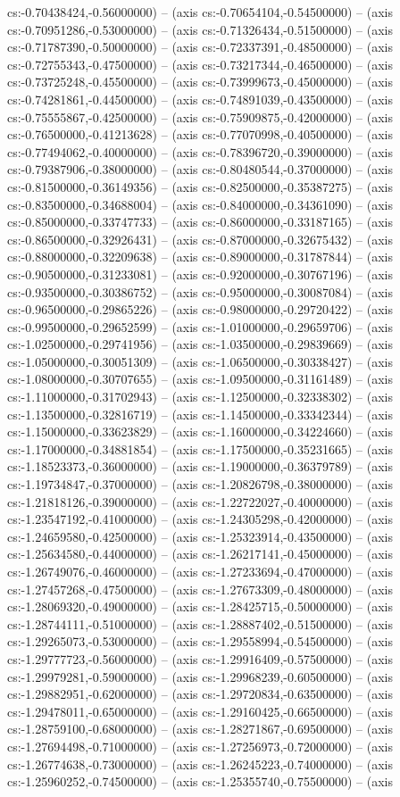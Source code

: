cs:-0.70438424,-0.56000000) -- (axis cs:-0.70654104,-0.54500000) -- (axis cs:-0.70951286,-0.53000000) -- (axis cs:-0.71326434,-0.51500000) -- (axis cs:-0.71787390,-0.50000000) -- (axis cs:-0.72337391,-0.48500000) -- (axis cs:-0.72755343,-0.47500000) -- (axis cs:-0.73217344,-0.46500000) -- (axis cs:-0.73725248,-0.45500000) -- (axis cs:-0.73999673,-0.45000000) -- (axis cs:-0.74281861,-0.44500000) -- (axis cs:-0.74891039,-0.43500000) -- (axis cs:-0.75555867,-0.42500000) -- (axis cs:-0.75909875,-0.42000000) -- (axis cs:-0.76500000,-0.41213628) -- (axis cs:-0.77070998,-0.40500000) -- (axis cs:-0.77494062,-0.40000000) -- (axis cs:-0.78396720,-0.39000000) -- (axis cs:-0.79387906,-0.38000000) -- (axis cs:-0.80480544,-0.37000000) -- (axis cs:-0.81500000,-0.36149356) -- (axis cs:-0.82500000,-0.35387275) -- (axis cs:-0.83500000,-0.34688004) -- (axis cs:-0.84000000,-0.34361090) -- (axis cs:-0.85000000,-0.33747733) -- (axis cs:-0.86000000,-0.33187165) -- (axis cs:-0.86500000,-0.32926431) -- (axis cs:-0.87000000,-0.32675432) -- (axis cs:-0.88000000,-0.32209638) -- (axis cs:-0.89000000,-0.31787844) -- (axis cs:-0.90500000,-0.31233081) -- (axis cs:-0.92000000,-0.30767196) -- (axis cs:-0.93500000,-0.30386752) -- (axis cs:-0.95000000,-0.30087084) -- (axis cs:-0.96500000,-0.29865226) -- (axis cs:-0.98000000,-0.29720422) -- (axis cs:-0.99500000,-0.29652599) -- (axis cs:-1.01000000,-0.29659706) -- (axis cs:-1.02500000,-0.29741956) -- (axis cs:-1.03500000,-0.29839669) -- (axis cs:-1.05000000,-0.30051309) -- (axis cs:-1.06500000,-0.30338427) -- (axis cs:-1.08000000,-0.30707655) -- (axis cs:-1.09500000,-0.31161489) -- (axis cs:-1.11000000,-0.31702943) -- (axis cs:-1.12500000,-0.32338302) -- (axis cs:-1.13500000,-0.32816719) -- (axis cs:-1.14500000,-0.33342344) -- (axis cs:-1.15000000,-0.33623829) -- (axis cs:-1.16000000,-0.34224660) -- (axis cs:-1.17000000,-0.34881854) -- (axis cs:-1.17500000,-0.35231665) -- (axis cs:-1.18523373,-0.36000000) -- (axis cs:-1.19000000,-0.36379789) -- (axis cs:-1.19734847,-0.37000000) -- (axis cs:-1.20826798,-0.38000000) -- (axis cs:-1.21818126,-0.39000000) -- (axis cs:-1.22722027,-0.40000000) -- (axis cs:-1.23547192,-0.41000000) -- (axis cs:-1.24305298,-0.42000000) -- (axis cs:-1.24659580,-0.42500000) -- (axis cs:-1.25323914,-0.43500000) -- (axis cs:-1.25634580,-0.44000000) -- (axis cs:-1.26217141,-0.45000000) -- (axis cs:-1.26749076,-0.46000000) -- (axis cs:-1.27233694,-0.47000000) -- (axis cs:-1.27457268,-0.47500000) -- (axis cs:-1.27673309,-0.48000000) -- (axis cs:-1.28069320,-0.49000000) -- (axis cs:-1.28425715,-0.50000000) -- (axis cs:-1.28744111,-0.51000000) -- (axis cs:-1.28887402,-0.51500000) -- (axis cs:-1.29265073,-0.53000000) -- (axis cs:-1.29558994,-0.54500000) -- (axis cs:-1.29777723,-0.56000000) -- (axis cs:-1.29916409,-0.57500000) -- (axis cs:-1.29979281,-0.59000000) -- (axis cs:-1.29968239,-0.60500000) -- (axis cs:-1.29882951,-0.62000000) -- (axis cs:-1.29720834,-0.63500000) -- (axis cs:-1.29478011,-0.65000000) -- (axis cs:-1.29160425,-0.66500000) -- (axis cs:-1.28759100,-0.68000000) -- (axis cs:-1.28271867,-0.69500000) -- (axis cs:-1.27694498,-0.71000000) -- (axis cs:-1.27256973,-0.72000000) -- (axis cs:-1.26774638,-0.73000000) -- (axis cs:-1.26245223,-0.74000000) -- (axis cs:-1.25960252,-0.74500000) -- (axis cs:-1.25355740,-0.75500000) -- (axis 